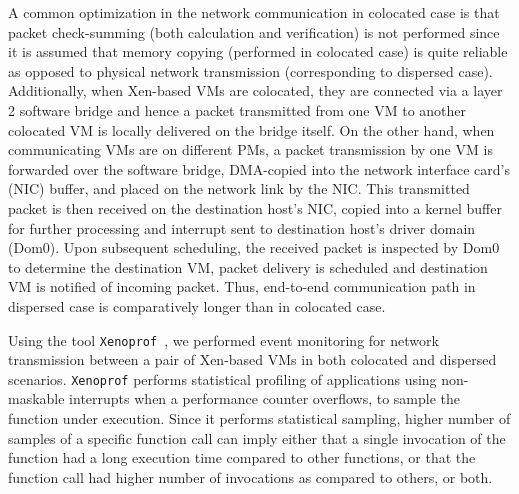 A common optimization in the network communication in colocated case is that 
packet check-summing
(both calculation and verification) is not performed since it is assumed 
that memory copying (performed in colocated case) is quite reliable as 
opposed to physical network transmission (corresponding to dispersed case). 
Additionally, when Xen-based VMs are colocated, they are
connected via a layer 2 software bridge and hence a packet 
transmitted from one VM to another colocated VM is locally delivered 
on the bridge itself. On the other hand, when communicating VMs 
are on different PMs, a packet transmission by one VM
is forwarded over the software bridge, 
DMA-copied
into the network interface 
card's (NIC) 
buffer, and placed on the network link by the NIC. This
transmitted packet is then received on the destination host's NIC, 
copied into a kernel buffer for further processing
and interrupt sent to destination host's driver domain (Dom0). Upon
subsequent scheduling, the received packet is inspected by Dom0 to
determine the destination VM, packet delivery is scheduled and destination 
VM is notified of incoming packet. Thus, end-to-end communication
path in dispersed case is comparatively longer than in colocated case.

Using the tool \texttt{Xenoprof}~\cite{xenoprof}, we performed
event monitoring for network transmission between a pair of Xen-based 
VMs in both colocated and dispersed scenarios. 
\texttt{Xenoprof} performs statistical profiling of applications
using non-maskable interrupts when a performance counter overflows,
to sample the function under execution. Since it
performs statistical sampling, higher number of samples 
of a specific function call can imply either that a
single invocation of the function had a long execution 
time compared to other functions, 
or that the function call had higher
number of invocations as compared to others, or both.

